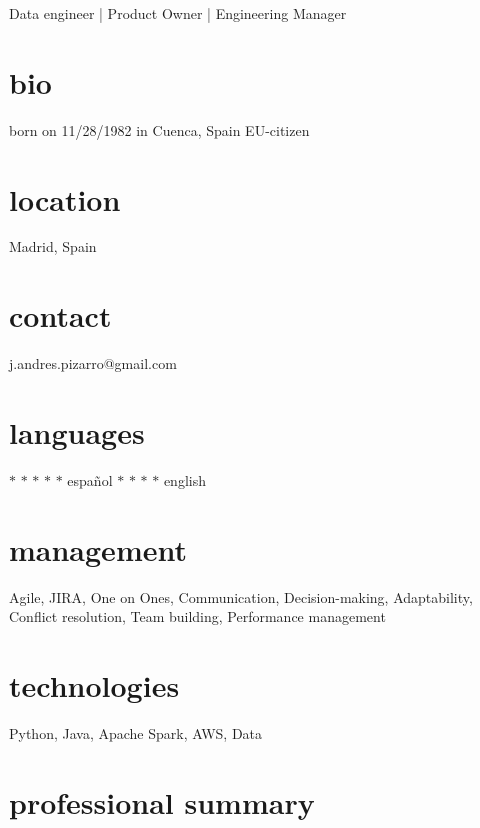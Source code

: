 \documentclass[]{friggeri-cv}
\begin{document}
       {Data engineer | Product Owner | Engineering Manager}



\begin{aside} %
  \section{bio}
  born on 11/28/1982
  in Cuenca, Spain
  EU-citizen
  \section{location}
  Madrid, Spain
  \section{contact}
  j.andres.pizarro@gmail.com
  \section{languages}
  {\color{lightgray} $\ast$}{\color{lightgray} $\ast$}{\color{lightgray} $\ast$}{\color{lightgray} $\ast$}{\color{lightgray} $\ast$} español
  {\color{lightgray} $\ast$}{\color{lightgray} $\ast$}{\color{lightgray} $\ast$}{\color{lightgray} $\ast$} english
  \section{management}
  Agile, JIRA, One on Ones, Communication,
  Decision-making, Adaptability, Conflict resolution, Team building, Performance management
  \section{technologies}
  Python, Java, Apache Spark, AWS, Data
\end{aside}


\section{professional summary}
\end{document}
